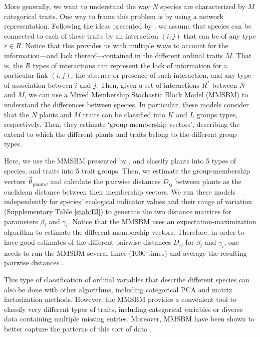 \documentclass[11pt, a4paper]{article}
\begin{document}
More generally, we want to understand the way $N$ species are characterized by $M$ categorical traits. One way to frame this problem is by using a network representation. Following the ideas presented by \citet{godoy-loriteAccurateScalableSocial2016}, we assume that species can be connected to each of these traits by an interaction $\left(i, j\right)$ that can be of any type $r\in R$. Notice that this provides us with multiple ways to account for the information---and lack thereof---contained in the different ordinal traits $M$. That is, the $R$ types of interactions can represent the lack of information for a particular link $\left(i, j\right)$, the absence or presence of such interaction, and any type of association between $i$ and $j$. Then, given a set of interactions $R^{*}$ between $N$ and $M$, we can use a Mixed Membership Stochastic Block Model (MMSBM) to understand the differences between species. In particular, these models consider that the $N$ plants and $M$ traits can be classified into $K$ and $L$ groups types, respectively. Then, they estimate `group-membership vectors', describing the extend to which the different plants and traits belong to the different group types.

Here, we use the MMSBM presented by \citet{godoy-loriteAccurateScalableSocial2016}, and classify plants into 5 types of species, and traits into 5 trait groups. Then, we estimate the group-membership vectors $\vec{\theta}_{\text{plants}}$, and calculate the pairwise distances $D_{ij}$ between plants as the euclidean distance between their membership vectors.  We run these models independently for species' ecological indicator values and their range of variation (Supplementary Table \ref{stab:EI}) to generate the two distance matrices for parameters $\beta_i$ and $\gamma_i$. Notice that the MMSBM uses an expectation-maximization algorithm to estimate the different membership vectors. Therefore, in order to have good estimates of the different pairwise distances $D_{ij}$ for $\beta_i$ and $\gamma_i$, one needs to run the MMSBM several times (1000 times) and average the resulting pairwise distances \citep{godoy-loriteAccurateScalableSocial2016, tarres-deulofeuTensorialBipartiteBlock2019}. 

This type of classification of ordinal variables that describe different species can also be done with other algorithms, including categorical PCA and matrix factorization methods. However, the MMSBM provides a convenient tool to classify very different types of traits, including categorical variables or diverse data containing multiple missing entries. Moreover, MMSBM have been shown to better capture the patterns of this sort of data \citet{godoy-loriteAccurateScalableSocial2016}.
\end{document}
